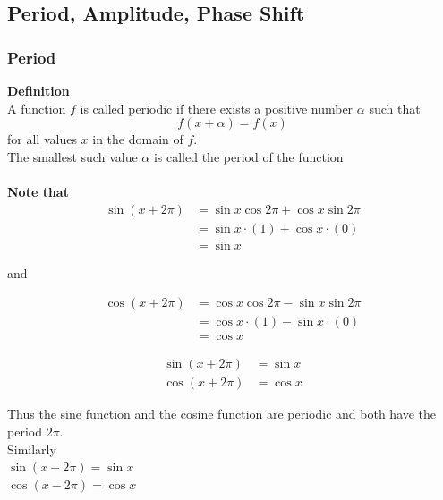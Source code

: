 \documentclass[11pt,a4paper]{article}
\begin{document}
\subsection{Period, Amplitude, Phase Shift}


\subsubsection{Period}

\textbf{Definition}\\
A function $f$ is called periodic if there exists a positive number $\alpha$ such that $$f(x + \alpha) = f(x)$$ for all values $x$ in the domain of $f$.\\
The smallest such value $\alpha$ is called the period of the function\\\\









\textbf{Note that}
\begin{align*}
\sin (x + 2\pi) & = \sin x \cos 2\pi + \cos x \sin 2\pi\\
& = \sin x \cdot (1) + \cos x \cdot (0)\\
& = \sin x
\end{align*}

and

\begin{align*}
\cos (x + 2\pi) &  = \cos x\cos 2\pi - \sin x \sin 2\pi\\
& = \cos x \cdot (1) - \sin x \cdot (0)\\
& = \cos x
\end{align*}






\begin{align*}
\sin (x + 2\pi) & = \sin x\\
\cos (x + 2\pi) & = \cos x
\end{align*}



Thus the sine function and the cosine function are periodic and both have the period $2\pi$.\\

Similarly\\

$\sin (x - 2\pi) = \sin x $\\

$\cos (x - 2\pi) = \cos x$\\\\
\end{document}
